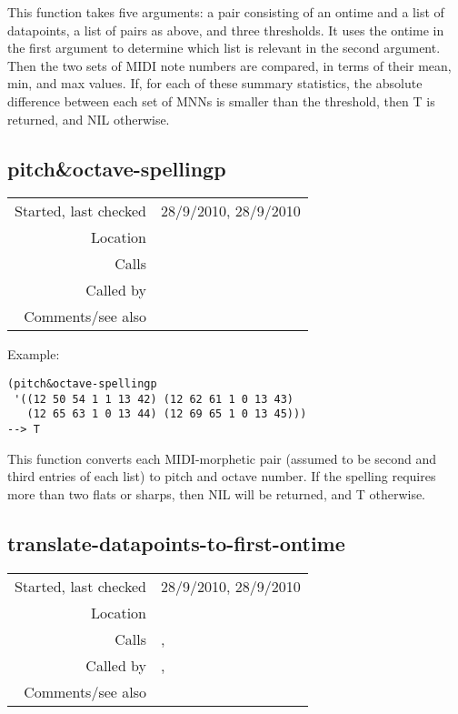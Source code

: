 \noindent This function takes five arguments: a pair
consisting of an ontime and a list of datapoints, a
list of pairs as above, and three thresholds. It uses
the ontime in the first argument to determine which
list is relevant in the second argument. Then the
two sets of MIDI note numbers are compared, in terms
of their mean, min, and max values. If, for each of
these summary statistics, the absolute difference
between each set of MNNs is smaller than the
threshold, then T is returned, and NIL otherwise.


\subsection*{pitch\&octave-spellingp}\label{fun:pitch-and-octave-spellingp}

\vspace{0.3cm}
\begin{tabular}{r|p{8cm}}
Started, last checked & 28/9/2010, 28/9/2010 \\
Location & \nameref{sec:generating-beat-MNN-spacing-forwards} \\
Calls & \nameref{fun:MIDI-morphetic-pair2pitch-and-octave} \\
Called by & \nameref{fun:checklistp} \\
Comments/see also & 
\end{tabular}

\vspace{0.5cm}
\noindent Example:
\begin{verbatim}
(pitch&octave-spellingp
 '((12 50 54 1 1 13 42) (12 62 61 1 0 13 43)
   (12 65 63 1 0 13 44) (12 69 65 1 0 13 45)))
--> T
\end{verbatim}

\noindent This function converts each MIDI-morphetic
pair (assumed to be second and third entries of each
list) to pitch and octave number. If the spelling
requires more than two flats or sharps, then NIL will
be returned, and T otherwise.


\subsection*{translate-datapoints-to-first-ontime}\label{fun:translate-datapoints-to-first-ontime}

\vspace{0.3cm}
\begin{tabular}{r|p{8cm}}
Started, last checked & 28/9/2010, 28/9/2010 \\
Location & \nameref{sec:generating-beat-MNN-spacing-forwards} \\
Calls & \nameref{fun:constant-vector}, \nameref{fun:translation} \\
Called by & \nameref{fun:generate-beat-MNN-spacing->},\newline \nameref{fun:generate-beat-spacing-forcing->} \\
Comments/see also & \nameref{fun:translate-datapoints-to-last-ontime}
\end{tabular}

